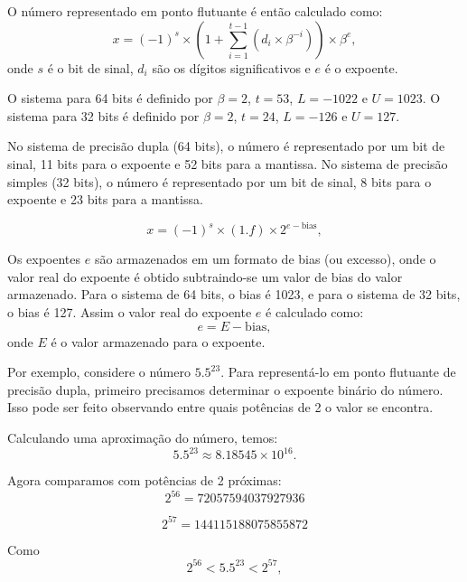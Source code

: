 O número representado em ponto flutuante é então calculado como:
\begin{equation}
x = (-1)^s \times (1 + \sum_{i=1}^{t-1} (d_i \times \beta^{-i})) \times \beta^e,
\end{equation}
onde $s$ é o bit de sinal, $d_i$ são os dígitos significativos e $e$ é o expoente.

O sistema para 64 bits é definido por $\beta = 2$, $t = 53$, $L = -1022$ e $U = 1023$. O sistema para 32 bits é definido por $\beta = 2$, $t = 24$, $L = -126$ e $U = 127$.

No sistema de precisão dupla (64 bits), o número é representado por um bit de sinal, 11 bits para o expoente e 52 bits para a mantissa. No sistema de precisão simples (32 bits), o número é representado por um bit de sinal, 8 bits para o expoente e 23 bits para a mantissa.

\begin{equation}
x = (-1)^s \times (1.\textit{f}) \times 2^{e - \text{bias}},
\end{equation}

Os expoentes $e$ são armazenados em um formato de bias (ou excesso), onde o valor real do expoente é obtido subtraindo-se um valor de bias do valor armazenado. Para o sistema de 64 bits, o bias é 1023, e para o sistema de 32 bits, o bias é 127. Assim o valor real do expoente $e$ é calculado como:
\begin{equation}
e = E - \text{bias},
\label{eq:expoente}
\end{equation}
onde $E$ é o valor armazenado para o expoente.

Por exemplo, considere o número $5.5^{23}$. Para representá-lo em ponto flutuante de precisão dupla, primeiro precisamos determinar o expoente binário do número. Isso pode ser feito observando entre quais potências de 2 o valor se encontra.

Calculando uma aproximação do número, temos:
\begin{equation}
5.5^{23} \approx 8.18545 \times 10^{16}.
\end{equation}

Agora comparamos com potências de 2 próximas:
\begin{equation}
2^{56} = 72057594037927936
\end{equation}

\begin{equation}
2^{57} = 144115188075855872
\end{equation}

Como
\begin{equation}
2^{56} < 5.5^{23} < 2^{57},
\end{equation}


